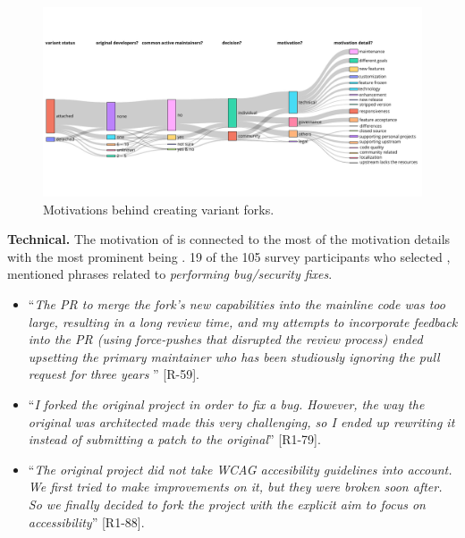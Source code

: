 \begin{figure}[ht]
\begin{center}
    \centering
    \includegraphics[width=\textwidth]{pdfs/sankey_motivations_2.pdf}
    \caption{Motivations behind creating variant forks.
    }
    \label{fig:sankey_motivation}
\end{center}
\vspace{-.3cm}
\end{figure}


\nd \textbf{Technical.} The motivation of  is connected to the most of the motivation details with the most prominent being . 19 of the 105 survey participants who selected , mentioned phrases related to \emph{performing bug/security fixes}.

\begin{itemize}[leftmargin=*]


\item ``\emph{The PR to merge the fork's new capabilities into the mainline code was too large, resulting in a long review time, and my attempts to incorporate feedback into the PR (using force-pushes that disrupted the review process) ended upsetting the primary maintainer who has been studiously ignoring the pull request for three years \frownie{}}'' [R-59].

\item ``\emph{I forked the original project in order to fix a bug. However, the way the original was architected made this very challenging, so I ended up rewriting it instead of submitting a patch to the original}'' [R1-79].

\item ``\emph{The original project did not take WCAG accesibility guidelines into account. We first tried to make improvements on it, but they were broken soon after. So we finally decided to fork the project with the explicit aim to focus on accessibility}'' [R1-88].

\end{itemize}

